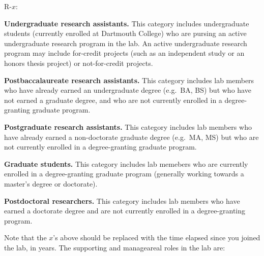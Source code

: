 \documentclass{tufte-book} %
\newcommand{\ourschool}{Dartmouth College}
\begin{document}
\begin{list}{R-$x$:~}{}
\item \textbf{Undergraduate research assistants.}  This category
  includes undergraduate students (currently enrolled at \ourschool)
  who are pursing an active undergraduate research program in the lab.
  An active undergraduate research program may include for-credit
  projects (such as an independent study or an honors thesis project)
  or not-for-credit projects.
\item \textbf{Postbaccalaureate research assistants.}  This category
  includes lab members who have already earned an undergraduate degree
  (e.g.\ BA, BS) but who have not earned a graduate degree, and who
  are not currently enrolled in a degree-granting graduate program.
\item \textbf{Postgraduate research assistants.}  This category
  includes lab members who have already earned a non-doctorate
  graduate degree (e.g.\ MA, MS) but who are not currently enrolled in
  a degree-granting graduate program.
\item \textbf{Graduate students.}  This category includes lab memebers
  who are currently enrolled in a degree-granting graduate program
  (generally working towards a master's degree or doctorate).
\item \textbf{Postdoctoral researchers.}  This category includes lab
  members who have earned a doctorate degree and are not currently
  enrolled in a degree-granting program.
\end{list}
Note that the $x$'s above should be replaced with the time elapsed since
you joined the lab, in years.  The supporting and manageareal roles
in the lab are:
\end{document}
